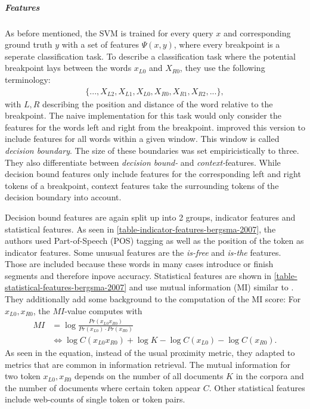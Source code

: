 \subparagraph*{\textbf{Features}}
As before mentioned, the SVM is trained for every query $x$ and corresponding ground truth $y$ with a set of features $\Psi(x,y)$, where every breakpoint is a seperate classification task. To describe a classification task where the potential breakpoint lays between the words $x_{L0}$ and $X_{R0}$, they use the following terminology:
\begin{align*}
\{..., X_{L2}, X_{L1}, X_{L0}, X_{R0}, X_{R1}, X_{R2},...\},
\end{align*}
with $L,R$ describing the position and distance of the word relative to the breakpoint.
The naive implementation for this task would only consider the features for the words left and right from the breakpoint. \citeauthor{Bergsma:2007} improved this version to include features for all words within a given window. This window is called \textit{decision boundary}. The size of these boundaries was set empiricistically to three.
They also differentiate between \textit{decision bound-} and \textit{context-}features. While decision bound features only include features for the corresponding left and right tokens of a breakpoint, context features take the surrounding tokens of the decision boundary into account.

Decision bound features are again split up into 2 groups, indicator features and statistical features. As seen in \ref{table-indicator-features-bergsma-2007}, the authors used Part-of-Speech (POS) tagging as well as the position of the token as indicator features. Some unusual features are the \textit{is-free} and \textit{is-the} features. Those are included because these words in many cases introduce or finish segments and therefore inpove accuracy.
Statistical features are shown in \ref{table-statistical-features-bergsma-2007} and use mutual information (MI) similar to \citeauthor{Risvik:2003}. They additionally add some background to the computation of the MI score: For $x_{L0},x_{R0}$, the $MI$-value computes with
\begin{align*}
MI &= \log \frac{Pr(x_{L0}x_{R0})}{Pr(x_{L0}) \cdot Pr(x_{R0})} \\
&\Leftrightarrow \log C(x_{L0}x_{R0}) + \log K - \log C(x_{L0}) - \log C(x_{R0}).
\end{align*}
As seen in the equation, instead of the usual proximity metric, they adapted to metrics that are common in information retrieval. The mutual information for two token $x_{L0},x_{R0}$ depends on the number of all documents $K$ in the corpora and the number of documents where certain token appear $C$.
Other statistical features include web-counts of single token or token pairs.

